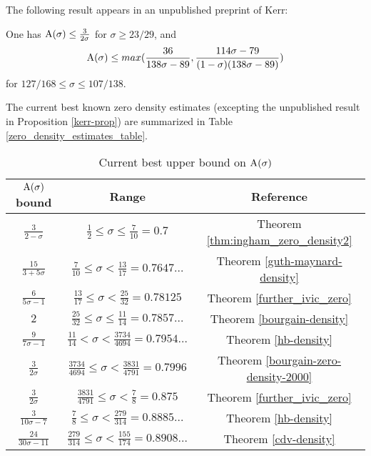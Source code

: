 The following result appears in an unpublished preprint of Kerr:

\begin{proposition}\label{kerr-prop}\cite[Theorems 6, 7]{kerr} One has $\mathrm{A}(\sigma) \leq \frac{3}{2\sigma}$ for $\sigma \geq 23/29$, and
$$\mathrm{A}(\sigma) \leq \\max( \frac{36}{138\sigma-89}, \frac{114\sigma-79}{(1-\sigma)(138\sigma-89)} )$$
for $127/168 \leq \sigma \leq 107/138$.
\end{proposition}

The current best known zero density estimates (excepting the unpublished result in Proposition \ref{kerr-prop}) are summarized in Table \ref{zero_density_estimates_table}.

\begin{table}[ht]
    \def\arraystretch{1.3}
    \centering
    \caption{Current best upper bound on $\mathrm{A}(\sigma)$}
    \begin{tabular}{|c|c|c|}
    \hline
    $\mathrm{A}(\sigma)$ bound & Range & Reference\\
    \hline
    $\frac{3}{2 - \sigma}$ & $\frac{1}{2} \leq \sigma \le \frac{7}{10} = 0.7$ & Theorem \ref{thm:ingham_zero_density2}\\
    \hline
    $\frac{15}{3+5\sigma}$ & $\frac{7}{10} \leq \sigma < \frac{13}{17} = 0.7647\ldots$ & Theorem \ref{guth-maynard-density}\\
    \hline
    $\frac{6}{5\sigma - 1}$ & $\frac{13}{17} \le \sigma < \frac{25}{32} = 0.78125$ & Theorem \ref{further_ivic_zero} \\
    \hline
    $2$ & $\frac{25}{32} \le \sigma \le \frac{11}{14} = 0.7857\ldots$ & Theorem \ref{bourgain-density} \\
    \hline
    $\frac{9}{7\sigma - 1}$ & $\frac{11}{14} < \sigma < \frac{3734}{4694} = 0.7954\ldots$ & Theorem \ref{hb-density} \\
    \hline
    $\frac{3}{2\sigma}$ & $\frac{3734}{4694} \le \sigma < \frac{3831}{4791} = 0.7996$ & Theorem \ref{bourgain-zero-density-2000} \\
    \hline
    $\frac{3}{2\sigma}$ & $\frac{3831}{4791} \le \sigma < \frac{7}{8} = 0.875$ & Theorem \ref{further_ivic_zero} \\
    \hline
    $\frac{3}{10\sigma - 7}$ & $\frac{7}{8} \le \sigma < \frac{279}{314} = 0.8885\ldots$ & Theorem \ref{hb-density}\\
    \hline
    $\frac{24}{30\sigma - 11}$ & $\frac{279}{314} \le \sigma < \frac{155}{174} = 0.8908\ldots$ & Theorem \ref{cdv-density}  \\

\end{tabular}
\end{table}
